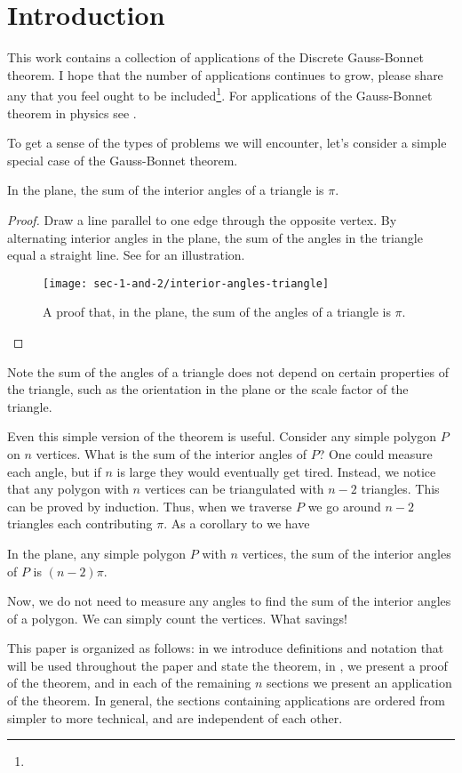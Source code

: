 \section{Introduction}
\label{sec:intro}

This work contains a collection of applications of the 
Discrete Gauss-Bonnet theorem.
I hope that the number of applications continues to grow,
please share any that you feel
ought to  be included\footnote{}.
For applications of the Gauss-Bonnet theorem in physics see \cite{tirado-physics-apps}.


To get a sense of the types of problems we will encounter,
let's consider a simple special case of the Gauss-Bonnet theorem.
\begin{theorem}\label{thm:triangle}
In the plane, the sum of the interior angles of a triangle is $\pi$.
\end{theorem}
\begin{proof}
Draw a line parallel to one edge through the opposite vertex.
By alternating interior angles in the plane, the sum of the angles
in the triangle equal  a straight line.
See  for an illustration. 



\begin{figure}[htb]
\centering
\texttt{[image: sec-1-and-2/interior-angles-triangle]}
\caption{A proof that, in the plane, the sum of the angles of a triangle is $\pi$.}
\label{fig:angles}
\end{figure}

\end{proof}

Note the sum of the angles of a triangle does not
depend on certain properties of the  triangle, such as the orientation in the plane or
the scale factor of the triangle.


Even this simple version of the theorem is useful.
Consider any simple polygon $P$ on $n$ vertices. 
What is the sum of the interior angles of $P$?
One could measure each angle, but if $n$ is large they would eventually
get tired.
Instead, we notice that any polygon with $n$ vertices can be
triangulated with $n-2$ triangles. This can be proved by induction.
Thus, when we traverse $P$ we go around $n-2$ triangles each contributing
$\pi$.
As a corollary to  we have
\begin{corollary}\label{cor:angles}
In the plane, any simple polygon $P$ with $n$ vertices,
the sum of the interior angles of $P$ is $(n-2)\pi$.

\end{corollary}

Now, we do not need to measure any angles to find
the sum of  the interior angles of a polygon. We can simply
count the vertices. What savings!

This paper is organized as follows:
in  we introduce definitions and notation that will be used
throughout the paper and state the theorem,
in , we present a proof of the theorem, and in each of the remaining $n$
sections we present an application of the theorem.
In general, the sections containing applications are ordered from simpler to more technical,
and are independent of each other.


